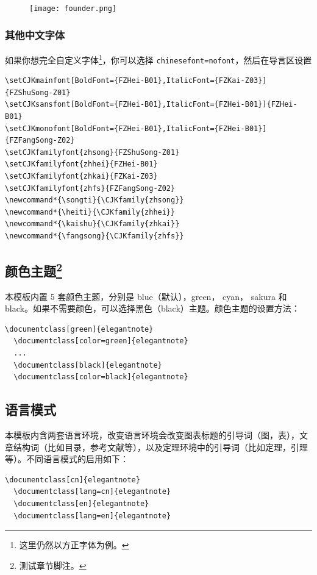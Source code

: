 \documentclass[cn,hazy,blue,10.5pt,normal]{elegantnote}
\begin{document}
\begin{figure}[!htb]
\centering
\texttt{[image: founder.png]}
\end{figure}

\subsubsection{其他中文字体}
如果你想完全自定义字体\footnote{这里仍然以方正字体为例。}，你可以选择 \lstinline{chinesefont=nofont}，然后在导言区设置
\begin{lstlisting}
\setCJKmainfont[BoldFont={FZHei-B01},ItalicFont={FZKai-Z03}]{FZShuSong-Z01}
\setCJKsansfont[BoldFont={FZHei-B01},ItalicFont={FZHei-B01}]{FZHei-B01}
\setCJKmonofont[BoldFont={FZHei-B01},ItalicFont={FZHei-B01}]{FZFangSong-Z02}
\setCJKfamilyfont{zhsong}{FZShuSong-Z01}
\setCJKfamilyfont{zhhei}{FZHei-B01}
\setCJKfamilyfont{zhkai}{FZKai-Z03}
\setCJKfamilyfont{zhfs}{FZFangSong-Z02}
\newcommand*{\songti}{\CJKfamily{zhsong}}
\newcommand*{\heiti}{\CJKfamily{zhhei}}
\newcommand*{\kaishu}{\CJKfamily{zhkai}}
\newcommand*{\fangsong}{\CJKfamily{zhfs}}
\end{lstlisting}


\subsection[颜色主题]{颜色主题\footnote{测试章节脚注。}}

本模板内置 5 套颜色主题，分别是 \textcolor{eblue}{blue}（默认），\textcolor{egreen}{green}， \textcolor{ecyan}{cyan}， \textcolor{sakura}{sakura} 和 \textcolor{black}{black}。如果不需要颜色，可以选择黑色（black）主题。颜色主题的设置方法：
\begin{lstlisting}[frame=none]  
  \documentclass[green]{elegantnote}
  \documentclass[color=green]{elegantnote}
  ...
  \documentclass[black]{elegantnote}
  \documentclass[color=black]{elegantnote}
\end{lstlisting}


\subsection{语言模式}

本模板内含两套语言环境，改变语言环境会改变图表标题的引导词（图，表），文章结构词（比如目录，参考文献等），以及定理环境中的引导词（比如定理，引理等）。不同语言模式的启用如下：
\begin{lstlisting}[frame=none]  
  \documentclass[cn]{elegantnote} 
  \documentclass[lang=cn]{elegantnote} 
  \documentclass[en]{elegantnote} 
  \documentclass[lang=en]{elegantnote}
\end{lstlisting}
\end{document}

